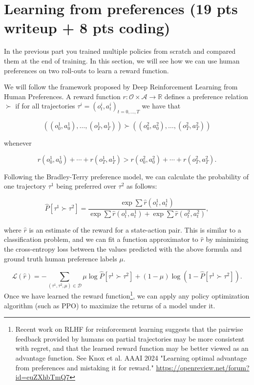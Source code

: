 \documentclass{article}
\begin{document}
\section{Learning from preferences (19 pts writeup + 8 pts coding)}

In the previous part you trained multiple policies from scratch and compared them at the end of training. In this section, we will see how we can use human preferences on two roll-outs to learn a reward function.

We will follow the framework proposed by Deep Reinforcement Learning from Human Preferences. A reward function $r: \mathcal{O} \times \mathcal{A} \rightarrow \mathbb{R}$ defines a preference relation $\succ$ if for all trajectories $\tau^i = (o^i_t,a^i_t)_{t=0,...,T}$ we have that

$$
\left(\left(o_0^1, a_0^1\right), \ldots,\left(o_{T}^1, a_{T}^1\right)\right) \succ\left(\left(o_0^2, a_0^2\right), \ldots,\left(o_{T}^2, a_{T}^2\right)\right)
$$

whenever

$$
r\left(o_0^1, a_0^1\right)+\cdots+r\left(o_{T}^1, a_{T}^1\right)>r\left(o_0^2, a_0^2\right)+\cdots+r\left(o_{T}^2, a_{T}^2\right) .
$$

Following the Bradley-Terry preference model, we can calculate the probability of one trajectory $\tau^1$ being preferred over $\tau^2$ as follows:

$$
\hat{P}\left[\tau^1 \succ \tau^2\right]=\frac{\exp \sum \hat{r}\left(o_t^1, a_t^1\right)}{\exp \sum \hat{r}\left(o_t^1, a_t^1\right)+\exp \sum \hat{r}\left(o_t^2, a_t^2\right)},
$$

where $\hat{r}$ is an estimate of the reward for a state-action pair. This is similar to a classification problem, and we can fit a function approximator to $\hat{r}$ by minimizing the cross-entropy loss between the values predicted with the above formula and ground truth human preference labels $\mu$.

$$
\mathcal{L}(\hat{r})=-\sum_{\left(\tau^1, \tau^2, \mu\right) \in \mathcal{D}} \mu \log \hat{P}\left[\tau^1 \succ \tau^2\right]+ (1 - \mu) \log (1 - \hat{P}\left[\tau^1 \succ \tau^2\right]).
$$
Once we have learned the reward function\footnote{Recent work on RLHF for reinforcement learning suggests that the pairwise feedback provided by humans on partial trajectories may be more consistent with regret, and that the learned reward function may be better viewed as an advantage function. See Knox et al. AAAI 2024 "Learning optimal advantage from preferences and mistaking it for reward." \url{https://openreview.net/forum?id=euZXhbTmQ7}}, we can apply any policy optimization algorithm (such as PPO) to maximize the returns of a model under it.
\end{document}
